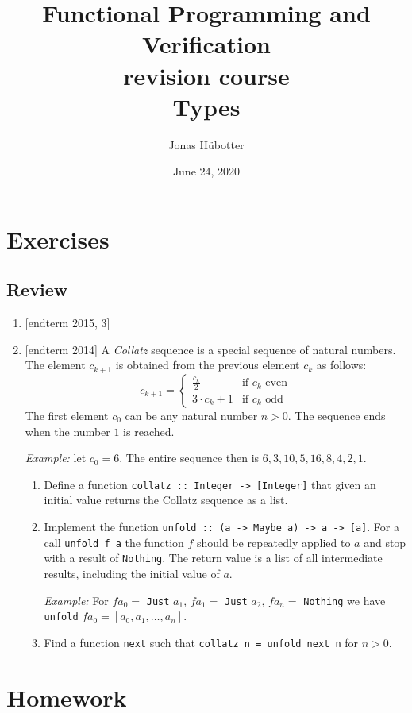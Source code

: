 \documentclass{article}
\title{Functional Programming and Verification \\ revision course \\ Types}
\author{Jonas Hübotter}
\date{June 24, 2020}
\begin{document}
\maketitle

\section{Exercises}

\subsection{Review}
\begin{enumerate}
\item {[endterm 2015, 3]}
\item {[endterm 2014]} A \textit{Collatz} sequence is a special sequence of natural numbers. The element $c_{k+1}$ is obtained from the previous element $c_k$ as follows:
\[
c_{k+1} =
\begin{cases}
  \frac{c_k}{2} & \text{if $c_k$ even} \\
  3 \cdot c_k + 1 & \text{if $c_k$ odd}
\end{cases}
\]
The first element $c_0$ can be any natural number $n > 0$. The sequence ends when the number $1$ is reached. \par
\textit{Example:} let $c_0 = 6$. The entire sequence then is $6,3,10,5,16,8,4,2,1$.
\begin{enumerate}
\item Define a function \verb|collatz :: Integer -> [Integer]| that given an initial value returns the Collatz sequence as a list.
\item Implement the function \verb|unfold :: (a -> Maybe a) -> a -> [a]|. For a call \verb|unfold f a| the function $f$ should be repeatedly applied to $a$ and stop with a result of \verb|Nothing|. The return value is a list of all intermediate results, including the initial value of $a$. \par
\textit{Example:} For $f a_0 =$ \verb|Just| $a_1$, $f a_1 =$ \verb|Just| $a_2$, $f a_n =$ \verb|Nothing| we have \verb|unfold| $f a_0 = [a_0, a_1, \dots, a_n]$.
\item Find a function \verb|next| such that \verb|collatz n = unfold next n| for $n > 0$.
\end{enumerate}
\end{enumerate}

\section{Homework}

\printbibliography
\end{document}
